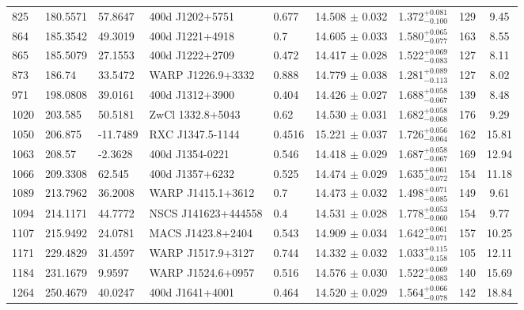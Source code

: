\documentclass[apj,twocolumn]{emulateapj}
\begin{document}
{\begin{table} [h!]
\begin{tabular}{l l l l l c c c c}
  825  &  180.5571 & 57.8647  & 400d J1202+5751     & 0.677  & 14.508 $\pm$  0.032  &     1.372$^{+0.081}_{-0.100}$  &       129 & 9.45  \\
  864  &  185.3542 & 49.3019  & 400d J1221+4918     & 0.7    & 14.605 $\pm$  0.033  &     1.580$^{+0.065}_{-0.077}$  &       163 & 8.55  \\
  865  &  185.5079 & 27.1553  & 400d J1222+2709     & 0.472  & 14.417 $\pm$  0.028  &     1.522$^{+0.069}_{-0.083}$  &       127 & 8.11  \\
  873  &  186.74   & 33.5472  & WARP J1226.9+3332   & 0.888  & 14.779 $\pm$  0.038  &     1.281$^{+0.089}_{-0.113}$  &       127 & 8.02  \\
  971  &  198.0808 & 39.0161  & 400d J1312+3900     & 0.404  & 14.426 $\pm$  0.027  &     1.688$^{+0.058}_{-0.067}$  &       139 & 8.48  \\
  1020 &  203.585  & 50.5181  & ZwCl 1332.8+5043    & 0.62   & 14.530 $\pm$  0.031  &     1.682$^{+0.058}_{-0.068}$  &       176 & 9.29  \\
  1050 &  206.875  & -11.7489 & RXC J1347.5-1144    & 0.4516 & 15.221 $\pm$  0.037  &     1.726$^{+0.056}_{-0.064}$  &       162 & 15.81 \\
  1063 &  208.57   & -2.3628  & 400d J1354-0221     & 0.546  & 14.418 $\pm$  0.029  &     1.687$^{+0.058}_{-0.067}$  &       169 & 12.94 \\ 
  1066 &  209.3308 & 62.545   & 400d J1357+6232     & 0.525  & 14.474 $\pm$  0.029  &     1.635$^{+0.061}_{-0.072}$  &       154 & 11.18 \\ 
  1089 &  213.7962 & 36.2008  & WARP J1415.1+3612   & 0.7    & 14.473 $\pm$  0.032  &     1.498$^{+0.071}_{-0.085}$  &       149 & 9.61  \\
  1094 &  214.1171 & 44.7772  & NSCS J141623+444558 & 0.4    & 14.531 $\pm$  0.028  &     1.778$^{+0.053}_{-0.060}$  &       154 & 9.77  \\
  1107 &  215.9492 & 24.0781  & MACS J1423.8+2404   & 0.543  & 14.909 $\pm$  0.034  &     1.642$^{+0.061}_{-0.071}$  &       157 & 10.25 \\
  1171 &  229.4829 & 31.4597  & WARP J1517.9+3127   & 0.744  & 14.332 $\pm$  0.032  &     1.033$^{+0.115}_{-0.158}$  &       105 & 12.11 \\
  1184 &  231.1679 & 9.9597   & WARP J1524.6+0957   & 0.516  & 14.576 $\pm$  0.030  &     1.522$^{+0.069}_{-0.083}$  &       140 & 15.69 \\
  1264 &  250.4679 & 40.0247  & 400d J1641+4001     & 0.464  & 14.520 $\pm$  0.029  &     1.564$^{+0.066}_{-0.078}$  &       142 & 18.84 \\

\end{tabular}
\end{table}}
\end{document}
